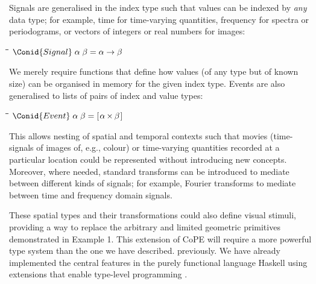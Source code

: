 Signals are generalised in the index type such that values can
be indexed by \emph{any} data type; for example, time for time-varying
quantities, frequency for spectra or periodograms, or vectors of
integers or real numbers for images:
\begin{tabbing}
\qquad\=\hspace{\lwidth}\=\hspace{\cwidth}\=\+\kill
$\Conid{Signal}\;\alpha\;\beta\mathrel{=}\alpha \to \beta$
\end{tabbing}
We merely require functions that define how values (of any type but of
known size) can be organised in memory for the given index type.
%
Events are also generalised to lists of pairs of index and value types: 
\begin{tabbing}
\qquad\=\hspace{\lwidth}\=\hspace{\cwidth}\=\+\kill
${\Conid{Event}\;\alpha\;\beta\mathrel{=}[\mskip1.5mu \alpha\;\!\!\times\!\!\;\beta\mskip1.5mu]}$
\end{tabbing}
This allows nesting of spatial and temporal contexts such that movies
(time-signals of images of, e.g., colour) or time-varying quantities
recorded at a particular location \citep[e.g., spot calcium
measurements as space-events of time-signals of
concentration;][]{DiGregorio1999} could be represented without
introducing new concepts. Moreover, where needed, standard transforms
can be introduced to mediate between different kinds of signals; for example,
Fourier transforms to mediate between time and frequency domain signals.

These spatial types and their transformations could also define visual
stimuli, providing a way to replace the arbitrary and limited
geometric primitives demonstrated in Example 1. This extension of CoPE
will require a more powerful type system than the one we have described.
previously. We have already implemented the central features in the purely
functional language Haskell using extensions that enable type-level
programming \citep{Kiselyov2010}.

